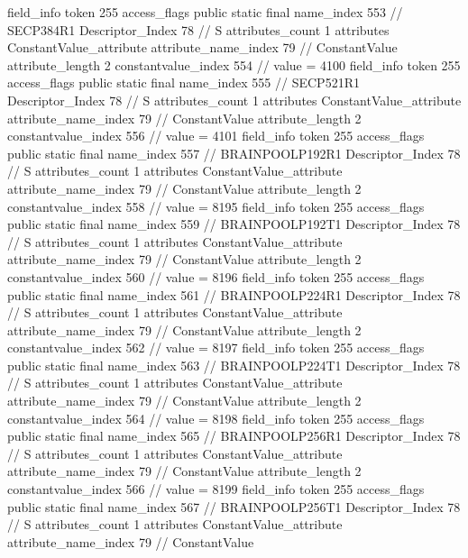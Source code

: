 {{{{{{{				}
				}
			}
			field_info {
				token	255
				access_flags	public static final
				name_index	553		// SECP384R1
				Descriptor_Index	78		// S
				attributes_count	1
				attributes {
				ConstantValue_attribute {
					attribute_name_index	79		// ConstantValue
					attribute_length	2
					constantvalue_index	554		// value = 4100
				}
				}
			}
			field_info {
				token	255
				access_flags	public static final
				name_index	555		// SECP521R1
				Descriptor_Index	78		// S
				attributes_count	1
				attributes {
				ConstantValue_attribute {
					attribute_name_index	79		// ConstantValue
					attribute_length	2
					constantvalue_index	556		// value = 4101
				}
				}
			}
			field_info {
				token	255
				access_flags	public static final
				name_index	557		// BRAINPOOLP192R1
				Descriptor_Index	78		// S
				attributes_count	1
				attributes {
				ConstantValue_attribute {
					attribute_name_index	79		// ConstantValue
					attribute_length	2
					constantvalue_index	558		// value = 8195
				}
				}
			}
			field_info {
				token	255
				access_flags	public static final
				name_index	559		// BRAINPOOLP192T1
				Descriptor_Index	78		// S
				attributes_count	1
				attributes {
				ConstantValue_attribute {
					attribute_name_index	79		// ConstantValue
					attribute_length	2
					constantvalue_index	560		// value = 8196
				}
				}
			}
			field_info {
				token	255
				access_flags	public static final
				name_index	561		// BRAINPOOLP224R1
				Descriptor_Index	78		// S
				attributes_count	1
				attributes {
				ConstantValue_attribute {
					attribute_name_index	79		// ConstantValue
					attribute_length	2
					constantvalue_index	562		// value = 8197
				}
				}
			}
			field_info {
				token	255
				access_flags	public static final
				name_index	563		// BRAINPOOLP224T1
				Descriptor_Index	78		// S
				attributes_count	1
				attributes {
				ConstantValue_attribute {
					attribute_name_index	79		// ConstantValue
					attribute_length	2
					constantvalue_index	564		// value = 8198
				}
				}
			}
			field_info {
				token	255
				access_flags	public static final
				name_index	565		// BRAINPOOLP256R1
				Descriptor_Index	78		// S
				attributes_count	1
				attributes {
				ConstantValue_attribute {
					attribute_name_index	79		// ConstantValue
					attribute_length	2
					constantvalue_index	566		// value = 8199
				}
				}
			}
			field_info {
				token	255
				access_flags	public static final
				name_index	567		// BRAINPOOLP256T1
				Descriptor_Index	78		// S
				attributes_count	1
				attributes {
				ConstantValue_attribute {
					attribute_name_index	79		// ConstantValue
}}}}}}}
